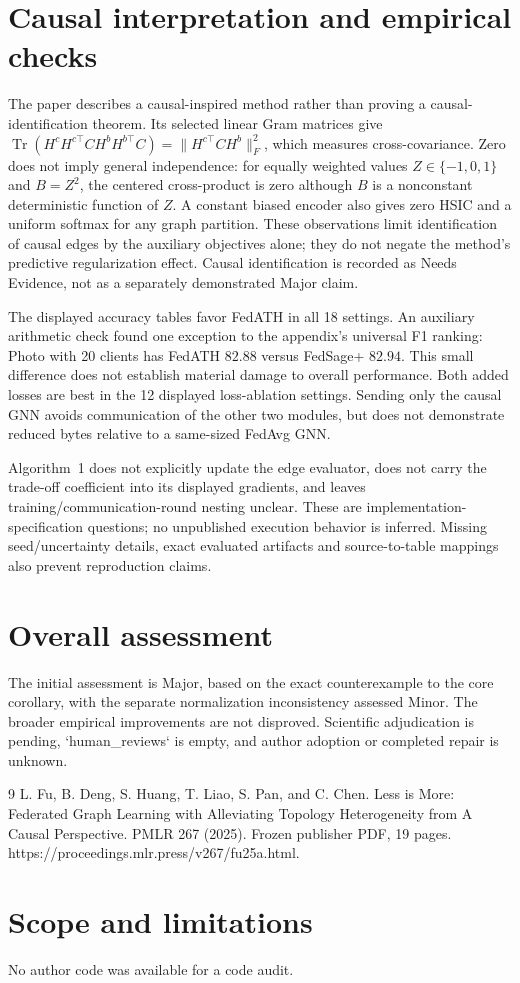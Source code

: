 \documentclass[10pt]{article}
\begin{document}
\section*{Causal interpretation and empirical checks}
The paper describes a causal-inspired method rather than proving a causal-identification theorem. Its selected linear Gram matrices give \(\operatorname{Tr}(H^cH^{c\top}CH^bH^{b\top}C)
=\|H^{c\top}CH^b\|_F^2\), which measures cross-covariance. Zero does not imply general independence: for equally weighted values \(Z\in\{-1,0,1\}\) and \(B=Z^2\), the centered cross-product is zero although \(B\) is a nonconstant deterministic function of \(Z\). A constant biased encoder also gives zero HSIC and a uniform softmax for any graph partition. These observations limit identification of causal edges by the auxiliary objectives alone; they do not negate the method’s predictive regularization effect. Causal identification is recorded as Needs Evidence, not as a separately demonstrated Major claim.\par
The displayed accuracy tables favor FedATH in all 18 settings. An auxiliary arithmetic check found one exception to the appendix’s universal F1 ranking: Photo with 20 clients has FedATH \(82.88\) versus FedSage+ \(82.94\). This small difference does not establish material damage to overall performance. Both added losses are best in the 12 displayed loss-ablation settings. Sending only the causal GNN avoids communication of the other two modules, but does not demonstrate reduced bytes relative to a same-sized FedAvg GNN.\par
Algorithm 1 does not explicitly update the edge evaluator, does not carry the trade-off coefficient into its displayed gradients, and leaves training/communication-round nesting unclear. These are implementation-specification questions; no unpublished execution behavior is inferred. Missing seed/uncertainty details, exact evaluated artifacts and source-to-table mappings also prevent reproduction claims.\par
\section*{Overall assessment}
The initial assessment is Major, based on the exact counterexample to the core corollary, with the separate normalization inconsistency assessed Minor. The broader empirical improvements are not disproved. Scientific adjudication is pending, `human\_reviews` is empty, and author adoption or completed repair is unknown.\par
9 L. Fu, B. Deng, S. Huang, T. Liao, S. Pan, and C. Chen. Less is More: Federated Graph Learning with Alleviating Topology Heterogeneity from A Causal Perspective. PMLR 267 (2025). Frozen publisher PDF, 19 pages. https://proceedings.mlr.press/v267/fu25a.html.\par
\section*{Scope and limitations}
No author code was available for a code audit.\par
\end{document}
